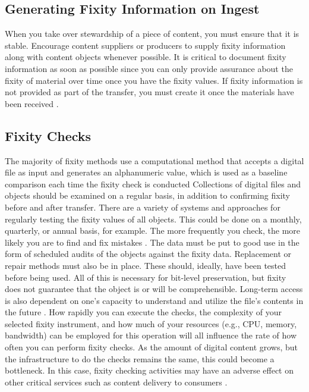 \subsection{Generating Fixity Information on Ingest}
When you take over stewardship of a piece of content, you must ensure that it is stable. Encourage content suppliers or producers to supply fixity information along with content objects whenever possible. It is critical to document fixity information as soon as possible since you can only provide assurance about the fixity of material over time once you have the fixity values. If fixity information is not provided as part of the transfer, you must create it once the materials have been received \cite[3]{ndsa2014fixity}.

\subsection{Fixity Checks}
The majority of fixity methods use a computational method that accepts a digital file as input and generates an alphanumeric value, which is used as a baseline comparison each time the fixity check is conducted \cite[5]{ndsa2017fixity}
Collections of digital files and objects should be examined on a regular basis, in addition to confirming fixity before and after transfer. There are a variety of systems and approaches for regularly testing the fixity values of all objects. This could be done on a monthly, quarterly, or annual basis, for example. The more frequently you check, the more likely you are to find and fix mistakes \cite[3]{ndsa2014fixity}.
The data must be put to good use in the form of scheduled audits of the objects against the fixity data. Replacement or repair methods must also be in place. These should, ideally, have been tested before being used. All of this is necessary for bit-level preservation, but fixity does not guarantee that the object is or will be comprehensible. Long-term access is also dependent on one's capacity to understand and utilize the file's contents in the future \cite[1]{ndsa2014fixity}.
How rapidly you can execute the checks, the complexity of your selected fixity instrument, and how much of your resources (e.g., CPU, memory, bandwidth) can be employed for this operation will all influence the rate of how often you can perform fixity checks. As the amount of digital content grows, but the infrastructure to do the checks remains the same, this could become a bottleneck. In this case, fixity checking activities may have an adverse effect on other critical services such as content delivery to consumers \cite[4]{ndsa2014fixity}.
